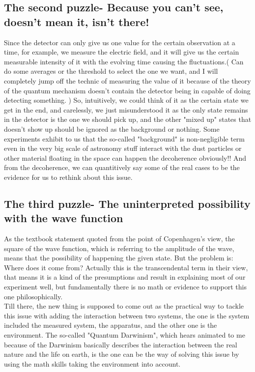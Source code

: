 \documentclass[final,1p,12pt]{elsarticle}
\begin{document}
\subsection{The second puzzle- Because you can't see, doesn't mean it, isn't there!}
Since the detector can only give us one value for the certain observation at a time, for example, we measure the electric field, and it will give us the certain measurable intensity of it with the evolving time causing the fluctuations.( Can do some averages or the threshold to select the one we want, and I will completely jump off the technic of measuring the value of it because of the theory of the quantum mechanism doesn't contain the detector being in capable of doing detecting something. ) So, intuitively, we could think of it as the certain state we get in the end, and carelessly, we just misunderstood it as the only state remains in the detector is the one we should pick up, and the other "mixed up" states that doesn't show up should be ignored as the background or nothing. Some experiments exhibit to us that the so-called "background" is non-negligible term even in the very big scale of astronomy stuff interact with the dust particles or other material floating in the space can happen the decoherence obviously!\cite{Kiefer}! And from the decoherence, we can quantitively say some of the real cases to be the evidence for us to rethink about this issue.\\

\subsection{The third puzzle- The uninterpreted possibility with the wave function}
As the textbook statement quoted from the point of Copenhagen's view, the square of the wave function, which is referring to the amplitude of the wave, means that the possibility of happening the given state. But the problem is: Where does it come from? Actually this is the transcendental term in their view, that means it is a kind of the presumptions and result in explaining most of our experiment well, but fundamentally there is no math or evidence to support this one philosophically. \\

Till there, the new thing is supposed to come out as the practical way to tackle this issue with adding the interaction between two systems, the one is the system included the measured system, the apparatus, and the other one is the environment. The so-called "Quantum Darwinism", which hears animated to me because of the Darwinism basically describes the interaction between the real nature and the life on earth, is the one can be the way of solving this issue by using the math skills taking the environment into account.\\  
\end{document}
